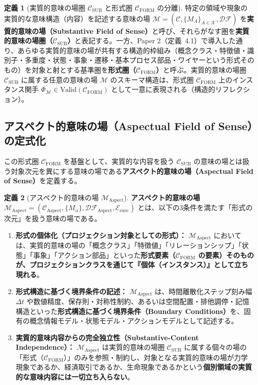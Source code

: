 \documentclass[11pt,a4paper]{ltjsarticle}
\theoremstyle{definition}
\newtheorem{definition}{定義}[section]
\theoremstyle{plain}
\theoremstyle{remark}
\newcommand{\Valid}{\mathrm{Valid}}
\newcommand{\CFORM}{\mathcal{C}_{\mathrm{FORM}}}
\newcommand{\CSUB}{\mathcal{C}_{\mathrm{SUB}}}
\newcommand{\CAspect}{\mathcal{C}_{\mathrm{Aspect}}}
\newcommand{\MAspect}{\mathcal{M}_{\mathrm{Aspect}}}
\newcommand{\Eexec}{\mathcal{E}_{\mathrm{exec}}}
\begin{document}
\begin{definition}[実質的意味の場圏 $\CSUB$ と形式圏 $\CFORM$ の分離]\label{def:sub-vs-form}
特定の領域や現象の実質的な意味構造（内容）を記述する意味の場 $\mathcal{M} = (\mathcal{C}, \{M_A\}_{A \in \mathcal{K}}, \mathcal{DF})$ を\textbf{実質的意味の場（Substantive Field of Sense）}と呼び、それらがなす圏を\textbf{実質的意味の場圏（$\CSUB$）}と表記する。一方、Paper 2（定義~4.1）で導入した通り、あらゆる実質的意味の場が共有する構造的枠組み（概念クラス・特徴値・識別子・多重度・状態・事象・遷移・基本プロセス部品・ワイヤーという形式そのもの）を対象と射とする基準圏を\textbf{形式圏（$\CFORM$）}と呼ぶ。実質的意味の場圏 $\CSUB$ に属する任意の意味の場 $\mathcal{M}$ のスキーマ構造は、形式圏 $\CFORM$ 上のインスタンス関手 $\Phi_{\mathcal{M}} \in \Valid(\CFORM)$ として一意に表現される（構造的リフレクション）。
\end{definition}

\subsection{アスペクト的意味の場（Aspectual Field of Sense）の定式化}
この形式圏 $\CFORM$ を基盤として、実質的な内容を扱う $\CSUB$ の意味の場とは扱う対象次元を異にする意味の場である\textbf{アスペクト的意味の場（Aspectual Field of Sense）}を定義する。

\begin{definition}[アスペクト的意味の場 $\MAspect$]\label{def:aspectual-field}
\textbf{アスペクト的意味の場 $\MAspect = (\CAspect, \{M_{\alpha}\}, \mathcal{DF}_{\mathrm{Aspect}}, \Eexec)$} とは、以下の3条件を満たす「形式の次元」を扱う意味の場である。
\begin{enumerate}
    \item \textbf{形式の個体化（プロジェクション対象としての形式）：} $\MAspect$ においては、実質的意味の場の「概念クラス」「特徴値」「リレーションシップ」「状態」「事象」「アクション部品」といった\textbf{形式要素（$\CFORM$ の要素）そのものが、プロジェクションクラスを通じて『個体（インスタンス）』として立ち現れる}。
    \item \textbf{形式構造に基づく境界条件の記述：} $\MAspect$ は、時間離散化ステップ刻み幅 $\Delta t$ や数値精度、保存則・対称性制約、あるいは空間配置・排他調停・記憶構造といった\textbf{形式構造に基づく境界条件（Boundary Conditions）}を、固有の概念情報モデル・状態モデル・アクションモデルとして記述する。
    \item \textbf{実質的意味内容からの完全独立性（Substantive-Content Independence）：} $\MAspect$ は実質的意味の場圏 $\CSUB$ に属する個々の場の「形式（$\CFORM$）」のみを参照・制約し、対象となる実質的意味の場が力学現象であるか、経済取引であるか、生命現象であるかという\textbf{個別領域の実質的な意味内容には一切立ち入らない}。
\end{enumerate}
\end{definition}
\end{document}
